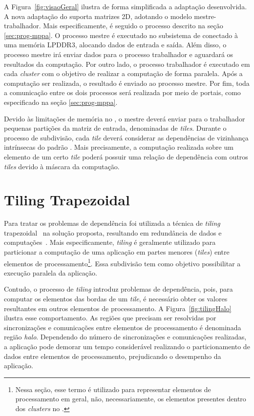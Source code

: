 A Figura~\ref{fig:visaoGeral} ilustra de forma simplificada a adaptação
desenvolvida. A nova adaptação do \fw suporta matrizes \stencil 2D, adotando o modelo
mestre-trabalhador. Mais especificamente, é seguido o processo descrito na seção
\ref{sec:prog-mppa}. O processo mestre é executado no subsistema de \es conectado
à uma memória LPDDR3, alocando dados de entrada e saída. Além disso, o processo
mestre irá enviar dados para o processo trabalhador e aguardará os resultados da
computação. Por outro lado, o processo trabalhador é executado em cada
\textit{cluster} com o objetivo de realizar a computação \stencil de forma
paralela. Após a computação ser realizada, o resultado é enviado ao processo
mestre. Por fim, toda a comunicação entre os dois processos será realizada por
meio de portais, como especificado na seção \ref{sec:prog-mppa}.

Devido às limitações de memória no \mppa, o mestre deverá enviar para o
trabalhador pequenas partições da matriz de entrada, denominadas de
\textit{tiles}. Durante o processo de subdivisão, cada \textit{tile} deverá
considerar as dependências de vizinhança intrínsecas do padrão \stencil. Mais
precisamente, a computação realizada sobre um elemento de um certo \textit{tile}
poderá possuir uma relação de dependência com outros \textit{tiles} devido à
máscara da computação.


\section{Tiling Trapezoidal}

Para tratar os problemas de dependência foi utilizada a técnica de
\textit{tiling} trapezoidal~\cite{meng11} na solução proposta, resultando em redundância de
dados e computações~\cite{rocha17}. Mais especificamente, \textit{tiling} é
geralmente utilizado para particionar a computação de uma aplicação \stencil em
partes menores (\textit{tiles}) entre elementos de processamento\footnote{Nessa
seção, esse termo é utilizado para representar elementos de processamento em
geral, não, necessariamente, os elementos presentes dentro dos \textit{clusters}
no \mppa.}. Essa subdivisão tem como objetivo possibilitar a execução paralela da aplicação.

Contudo, o processo de \textit{tiling} introduz problemas de dependência, pois,
para computar os elementos das bordas de um \textit{tile}, é necessário obter
os valores resultantes em outros elementos de processamento. A Figura~\ref{fig:tilingHalo} ilustra
esse comportamento. As regiões que precisam ser resolvidas por sincronizações e
comunicações entre elementos de processamento é denominada região \textit{halo}. Dependendo do número
de sincronizações e comunicações realizadas, a aplicação pode demorar um tempo
considerável realizando o particionamento de dados entre elementos de
processamento, prejudicando o desempenho da aplicação.


